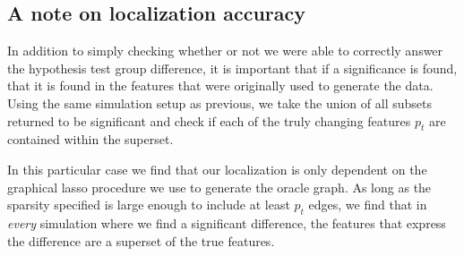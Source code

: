 \subsection*{A note on localization accuracy}
In addition to simply checking whether or not we were able to correctly answer the hypothesis test group difference, it is important that if a significance is found, that it is found in the features that were originally used to generate the data. Using the same simulation setup as previous, we take the union of all subsets returned to be significant and check if each of the truly changing features $p_t$ are contained within the superset.

In this particular case we find that our localization is only dependent on the graphical lasso procedure we use to generate the oracle graph. As long as the sparsity specified is large enough to include at least $p_t$ edges, we find that in \textit{every} simulation where we find a significant difference, the features that express the difference are a superset of the true features.
%
%
%
